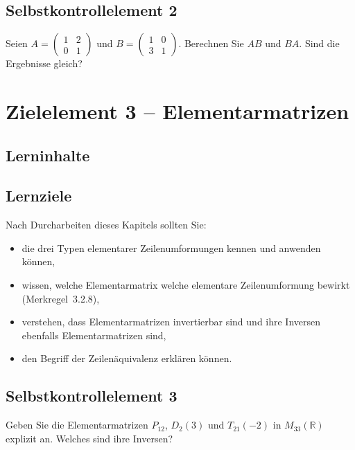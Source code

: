 \documentclass[a4paper,12pt]{article}
\begin{document}
\subsection*{Selbstkontrollelement 2}

Seien $A = \begin{pmatrix}1 & 2 \\ 0 & 1\end{pmatrix}$ und
$B = \begin{pmatrix}1 & 0 \\ 3 & 1\end{pmatrix}$.
Berechnen Sie $AB$ und $BA$. Sind die Ergebnisse gleich?

\newpage

\section*{Zielelement 3 -- Elementarmatrizen}

\subsection*{Lerninhalte}

\begin{center}
\end{center}

\subsection*{Lernziele}

Nach Durcharbeiten dieses Kapitels sollten Sie:
\begin{itemize}
  \item die drei Typen elementarer Zeilenumformungen kennen und anwenden können,
  \item wissen, welche Elementarmatrix welche elementare Zeilenumformung bewirkt
        (Merkregel~3.2.8),
  \item verstehen, dass Elementarmatrizen invertierbar sind und ihre Inversen
        ebenfalls Elementarmatrizen sind,
  \item den Begriff der Zeilenäquivalenz erklären können.
\end{itemize}

\subsection*{Selbstkontrollelement 3}

Geben Sie die Elementarmatrizen $P_{12}$, $D_2(3)$ und $T_{21}(-2)$ in $M_{33}(\mathbb{R})$
explizit an. Welches sind ihre Inversen?
\end{document}
